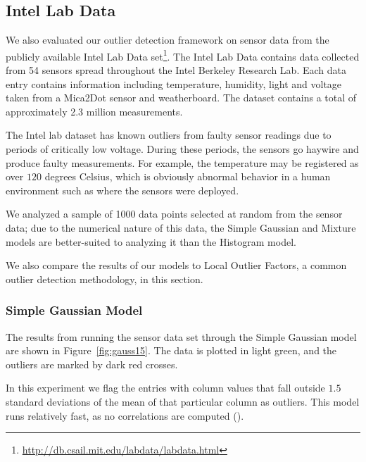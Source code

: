 \subsection{Intel Lab Data}
\label{sec:intel-lab-data-evaluation}

We also evaluated our outlier detection framework on sensor data from the publicly available Intel Lab Data set\footnote{\url{http://db.csail.mit.edu/labdata/labdata.html}}. The Intel Lab Data contains data collected from 54 sensors spread throughout the Intel Berkeley Research Lab. Each data entry contains information including temperature, humidity, light and voltage taken from a Mica2Dot sensor and weatherboard. The dataset contains a total of approximately 2.3 million measurements.

The Intel lab dataset has known outliers from faulty sensor readings due to periods of critically low voltage. During these periods, the sensors go haywire and produce faulty measurements. For example, the temperature may be registered as over $120$ degrees Celsius, which is obviously abnormal behavior in a human environment such as where the sensors were deployed.
 
We analyzed a sample of 1000 data points selected at random from the sensor data; due to the numerical nature of this data, the Simple Gaussian and Mixture models are better-suited to analyzing it than the Histogram model.

We also compare the results of our models to Local Outlier Factors, a common outlier detection methodology, in this section.
 
\subsubsection{Simple Gaussian Model}

The results from running the sensor data set through the Simple Gaussian model are shown in Figure~\ref{fig:gauss15}. The data is plotted in light green, and the outliers are marked by dark red crosses. 

In this experiment we flag the entries with column values that fall outside $1.5$ standard deviations of the mean of that particular column as outliers. This model runs relatively fast, as no correlations are computed ().


